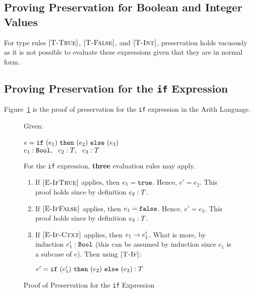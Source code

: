 \documentclass{report}
\newcommand{\rel}[1]{\mbox{\sc [#1]}}
\begin{document}
\subsection{Proving Preservation for Boolean and Integer Values}

For type rules $\rel{T-True}$, $\rel{T-False}$, and $\rel{T-Int}$, preservation holds vacuously as it is not possible to evaluate these expressions given that they are in normal form.

\subsection{Proving Preservation for the \texttt{if} Expression}

Figure~\ref{fig:ifProofPreservation} is the proof of preservation for the \texttt{if} expression in the Arith Language.

\begin{figure}[ht!]
Given:
\begin{center}
   $e = \mbox{\tt if}~({e_1})~\mbox{\tt then}~({e_2})~\mbox{\tt else}~({e_3})$~\\
   ${e_1} : {\mbox{\tt Bool}},~~{e_2} : {T},~~{e_3} : {T}$
\end{center}
For the \texttt{if} expression, \textbf{three} evaluation rules may apply.
\begin{enumerate}

    \item If $\rel{E-IfTrue}$ applies, then $e_1 = \mbox{\tt true}$.  Hence, $e' = e_2$.  This proof holds since by definition ${e_2} : {T}$.
      
    \item If $\rel{E-IfFalse}$ applies, then $e_1 = \mbox{\tt false}$.  Hence, $e' = e_3$.  This proof holds since by definition ${e_3} : {T}$.
    
    \item If $\rel{E-If-Ctxt}$ applies, then ${e_1} \rightarrow {e'_1}$.  What is more, by induction ${e'_1} : {\mbox{\tt Bool}}$ (this can be assumed by induction since $e_1$ is a subcase of $e$).  Then using $\rel{T-If}$:
    
    \begin{center}
      ${e' = \mbox{\tt if}~({e'_1})~\mbox{\tt then}~({e_2})~\mbox{\tt else}~({e_3})} : {T}$
    \end{center}
	
	\end{enumerate}
	
  \caption{Proof of Preservation for the \texttt{if} Expression}\label{fig:ifProofPreservation}
\end{figure} 
\end{document}
